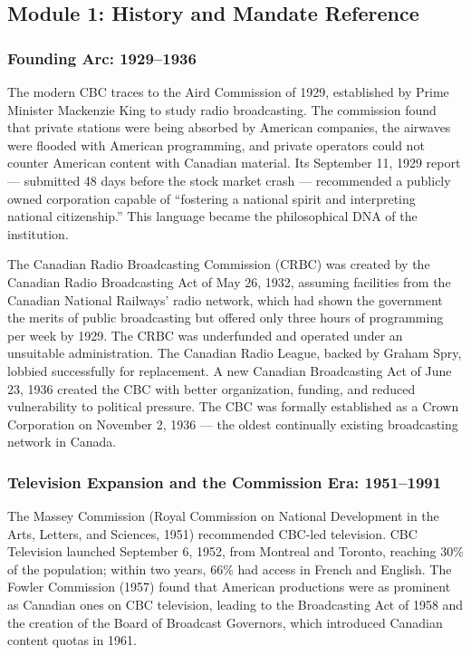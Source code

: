 \documentclass[11pt,letterpaper]{article}
\begin{document}
\subsection{Module 1: History and Mandate Reference}

\subsubsection{Founding Arc: 1929--1936}

The modern CBC traces to the Aird Commission of 1929, established by Prime Minister Mackenzie King to study radio broadcasting. The commission found that private stations were being absorbed by American companies, the airwaves were flooded with American programming, and private operators could not counter American content with Canadian material. Its September 11, 1929 report --- submitted 48 days before the stock market crash --- recommended a publicly owned corporation capable of ``fostering a national spirit and interpreting national citizenship.'' This language became the philosophical DNA of the institution.

The Canadian Radio Broadcasting Commission (CRBC) was created by the Canadian Radio Broadcasting Act of May 26, 1932, assuming facilities from the Canadian National Railways' radio network, which had shown the government the merits of public broadcasting but offered only three hours of programming per week by 1929. The CRBC was underfunded and operated under an unsuitable administration. The Canadian Radio League, backed by Graham Spry, lobbied successfully for replacement. A new Canadian Broadcasting Act of June 23, 1936 created the CBC with better organization, funding, and reduced vulnerability to political pressure. The CBC was formally established as a Crown Corporation on November 2, 1936 --- the oldest continually existing broadcasting network in Canada.

\subsubsection{Television Expansion and the Commission Era: 1951--1991}

The Massey Commission (Royal Commission on National Development in the Arts, Letters, and Sciences, 1951) recommended CBC-led television. CBC Television launched September 6, 1952, from Montreal and Toronto, reaching 30\% of the population; within two years, 66\% had access in French and English. The Fowler Commission (1957) found that American productions were as prominent as Canadian ones on CBC television, leading to the Broadcasting Act of 1958 and the creation of the Board of Broadcast Governors, which introduced Canadian content quotas in 1961.
\end{document}
